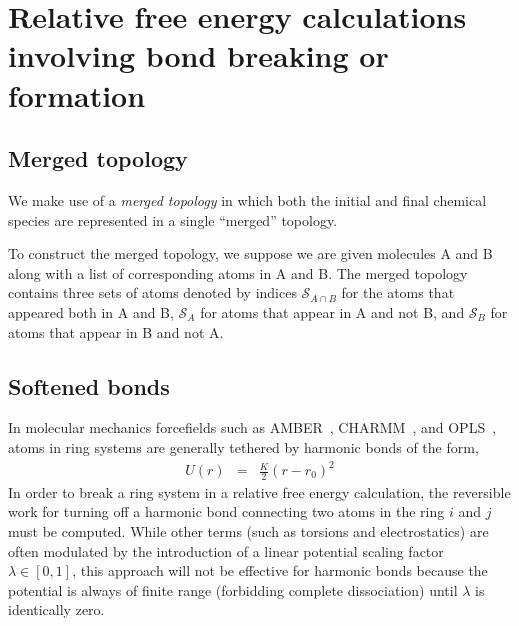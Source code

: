 \documentclass[aps,pre,twocolumn,superscriptaddress,nofootinbib]{revtex4-1}
\begin{document}

\section{Relative free energy calculations involving bond breaking or formation}

\subsection{Merged topology}

We make use of a \emph{merged topology} in which both the initial and final chemical species are represented in a single ``merged'' topology.

To construct the merged topology, we suppose we are given molecules A and B along with a list of corresponding atoms in A and B.
The merged topology contains three sets of atoms denoted by indices $\mathcal{S}_{A \cap B}$ for the atoms that appeared both in A and B, $\mathcal{S}_A$ for atoms that appear in A and not B, and $\mathcal{S}_B$ for atoms that appear in B and not A.

\subsection{Softened bonds}

In molecular mechanics forcefields such as AMBER~\cite{amber}, CHARMM~\cite{charmm}, and OPLS~\cite{opls}, atoms in ring systems are generally tethered by harmonic bonds of the form,
\begin{eqnarray}
U(r) &=& \frac{K}{2} (r - r_0)^2 \label{equation:harmonic-bond}
\end{eqnarray}
In order to break a ring system in a relative free energy calculation, the reversible work for turning off a harmonic bond connecting two atoms in the ring $i$ and $j$ must be computed.
While other terms (such as torsions and electrostatics) are often modulated by the introduction of a linear potential scaling factor $\lambda \in [0,1]$, this approach will not be effective for harmonic bonds because the potential is always of finite range (forbidding complete dissociation) until $\lambda$ is identically zero.
\end{document}
